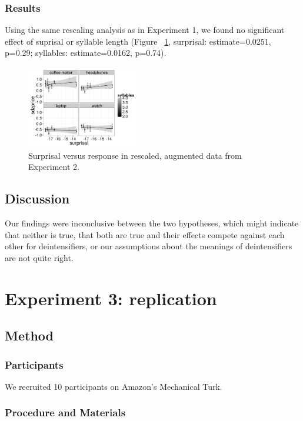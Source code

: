 \documentclass[10pt,letterpaper]{article}
\begin{document}
  \subsubsection{Results}    
  
    Using the same rescaling analysis as in Experiment 1, we found no significant effect of suprisal or syllable length (Figure ~\ref{scaled-figure-exp2}, surprisal: estimate=0.0251, p=0.29; syllables: estimate=0.0162, p=0.74).
  
    \begin{figure}[ht]
    \begin{center}
    \includegraphics[width=0.45\textwidth]{exp2-scaled.png}
    \end{center}
    \caption{Surprisal versus response in rescaled, augmented data from Experiment 2.} 
    \label{scaled-figure-exp2}
    \end{figure}
  \subsection{Discussion}
  
    Our findings were inconclusive between the two hypotheses, which might indicate that neither is true, that both are true and their effects compete against each other for deintensifiers, or our assumptions about the meanings of deintensifiers are not quite right.

\section{Experiment 3: replication}
  \subsection{Method}
    \subsubsection{Participants}
      We recruited 10 participants on Amazon's Mechanical Turk.
    \subsubsection{Procedure and Materials}
    
\end{document}
